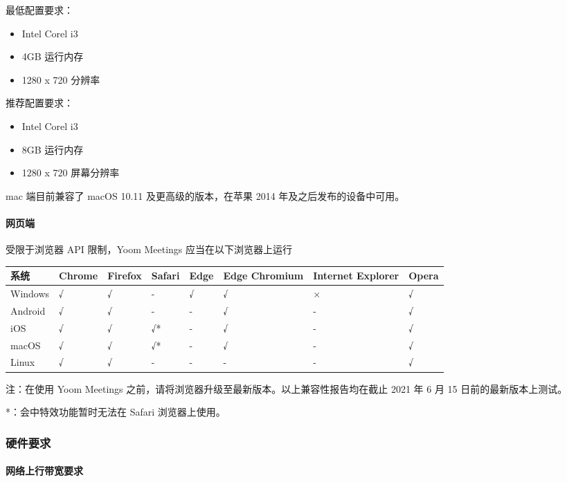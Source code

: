 \documentclass[]{ctexart}
\let\oldparagraph\paragraph
\renewcommand{\paragraph}[1]{\oldparagraph{#1}\mbox{}}
\begin{document}
最低配置要求：

\begin{itemize}
\item
  Intel Corel i3
\item
  4GB 运行内存
\item
  1280 x 720 分辨率
\end{itemize}

推荐配置要求：

\begin{itemize}
\item
  Intel Corel i3
\item
  8GB 运行内存
\item
  1280 x 720 屏幕分辨率
\end{itemize}

mac 端目前兼容了 macOS 10.11 及更高级的版本，在苹果 2014
年及之后发布的设备中可用。

\hypertarget{ux7f51ux9875ux7aef}{%
\paragraph{网页端}\label{ux7f51ux9875ux7aef}}

受限于浏览器 API 限制，Yoom Meetings 应当在以下浏览器上运行

\begin{longtable}[]{@{}llllllll@{}}
\toprule
系统 & Chrome & Firefox & Safari & Edge & Edge Chromium & Internet
Explorer & Opera\tabularnewline
\midrule
\endhead
Windows & √ & √ & - & √ & √ & × & √\tabularnewline
Android & √ & √ & - & - & √ & - & √\tabularnewline
iOS & √ & √ & √* & - & √ & - & √\tabularnewline
macOS & √ & √ & √* & - & √ & - & √\tabularnewline
Linux & √ & √ & - & - & - & - & √\tabularnewline
\bottomrule
\end{longtable}

注：在使用 Yoom Meetings
之前，请将浏览器升级至最新版本。以上兼容性报告均在截止 2021 年 6 月 15
日前的最新版本上测试。

*：会中特效功能暂时无法在 Safari 浏览器上使用。

\hypertarget{ux786cux4ef6ux8981ux6c42}{%
\subsubsection{硬件要求}\label{ux786cux4ef6ux8981ux6c42}}

\hypertarget{ux7f51ux7edcux4e0aux884cux5e26ux5bbdux8981ux6c42}{%
\paragraph{网络上行带宽要求}\label{ux7f51ux7edcux4e0aux884cux5e26ux5bbdux8981ux6c42}}
\end{document}
